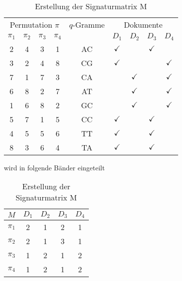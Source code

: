\begin{table}[H]
\begin{center}
		\begin{tabular}{|cccc|c|cccc|}
\hline
\multicolumn{4}{|c|}{Permutation $\pi$} & $q$-Gramme & \multicolumn{4}{|c|}{Dokumente}\\ 
$\pi_1$ & $\pi_2$ & $\pi_3$ & $\pi_4$&  & $D_1$ & $D_2$ & $D_3$ & $D_4$ \\
\hline 
2 & 4 & 3 & 1 &AC & $\checkmark$ & & $\checkmark$ &\\ 
3 & 2 & 4 & 8 &CG &  $\checkmark$& & &  $\checkmark$\\ 
7 & 1 & 7 & 3 &CA & & $\checkmark$ & & $\checkmark$\\ 
6 & 8 & 2 & 7 &AT & & $\checkmark$ & & $\checkmark$\\ 
1 & 6 & 8 & 2 &GC & &  $\checkmark$ & & $\checkmark$\\ 
5 & 7 & 1 & 5 &CC & $\checkmark$ &  & $\checkmark$ & \\ 
4 & 5 & 5 & 6 &TT & $\checkmark$  & &  $\checkmark$ &\\
8 & 3 & 6 & 4 &TA & $\checkmark$  & &   $\checkmark$&\\ 

\hline 
\end{tabular}
\end{center}
\begin{center}
wird in folgende Bänder eingeteilt
\end{center}
\begin{center}
\begin{tabular}{|c|cccc|}
\hline 
$M$ & $D_1$ & $D_2$ & $D_3$ & $D_4$ \\ 
\hline 
$\pi_1$ & 2 & 1 & 2 & 1 \\ 
$\pi_2$ & 2 & 1 & 3 & 1 \\ 
$\pi_3$ & 1 & 2 & 1 & 2 \\ 
$\pi_4$ & 1 & 2 & 1 & 2 \\ 
\hline 
\end{tabular} 
\end{center}
\caption{Erstellung der Signaturmatrix M}
\label{fig:signaturmatrix}
\label{table:sig}
\end{table}
